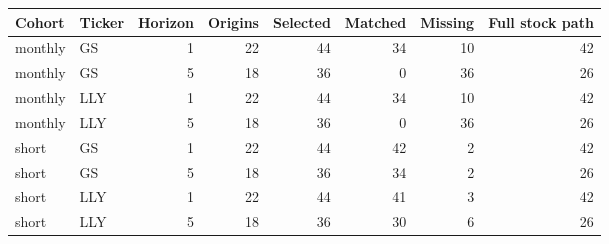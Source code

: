 \begin{tabular}{llrrrrrr}
\toprule
Cohort & Ticker & Horizon & Origins & Selected & Matched & Missing & Full stock path \\
\midrule
monthly & GS & 1 & 22 & 44 & 34 & 10 & 42 \\
monthly & GS & 5 & 18 & 36 & 0 & 36 & 26 \\
monthly & LLY & 1 & 22 & 44 & 34 & 10 & 42 \\
monthly & LLY & 5 & 18 & 36 & 0 & 36 & 26 \\
short & GS & 1 & 22 & 44 & 42 & 2 & 42 \\
short & GS & 5 & 18 & 36 & 34 & 2 & 26 \\
short & LLY & 1 & 22 & 44 & 41 & 3 & 42 \\
short & LLY & 5 & 18 & 36 & 30 & 6 & 26 \\
\bottomrule\end{tabular}
